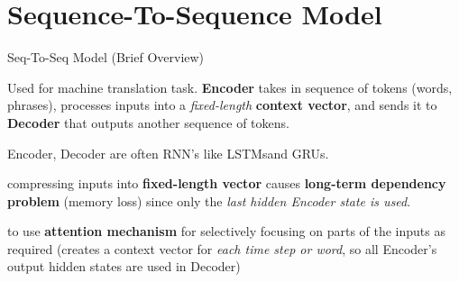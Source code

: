 

\section{Sequence-To-Sequence Model}


\begin{frame}{Seq-To-Seq Model (Brief Overview)}
    
    \normalsize 
    {\linespread{0.3}
    
    \begin{itemizeSpaced}{7pt}
        \pinkbox Used for machine translation task. \textbf{Encoder} takes in sequence of tokens (words, phrases), processes inputs into a \emph{fixed-length} \textbf{context vector}, and sends it to \textbf{Decoder} that outputs another sequence of tokens. 
        
        \item Encoder, Decoder are often RNN's \footnotemark like LSTMs\footnotemark and GRUs\footnotemark. 
        
         compressing inputs into \textbf{fixed-length vector} causes \textbf{long-term dependency problem} (memory loss) since only the \emph{last hidden Encoder state is used}. 
        
        to use \textbf{attention mechanism} for selectively focusing on parts of the inputs as required (creates a context vector for \emph{each time step or word}, so all Encoder's output hidden states are used in Decoder)
        
        
    \end{itemizeSpaced} }
    
    
    
    
\end{frame}